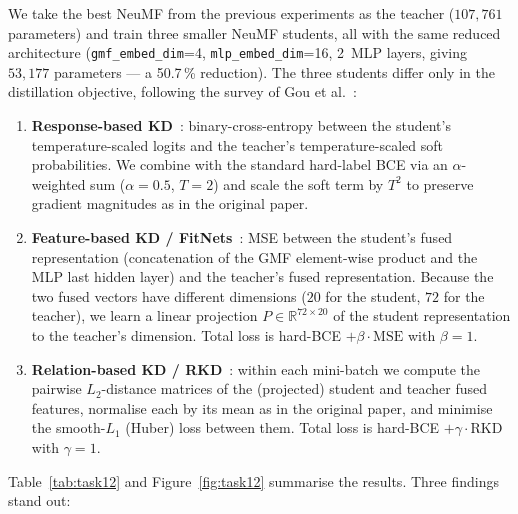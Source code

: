 \documentclass[11pt,a4paper]{article}
\begin{document}
We take the best NeuMF from the previous experiments as the teacher
($107{,}761$ parameters) and train three smaller NeuMF students, all
with the same reduced architecture
(\texttt{gmf\_embed\_dim}=4, \texttt{mlp\_embed\_dim}=16, 2~MLP layers,
giving $53{,}177$ parameters --- a 50.7\,\% reduction). The three
students differ only in the distillation objective, following the
survey of Gou et al.~\cite{gou2021kd}:

\begin{enumerate}
  \item \textbf{Response-based KD}~\cite{hinton2015distilling}:
        binary-cross-entropy between the student's
        temperature-scaled logits and the teacher's
        temperature-scaled soft probabilities. We combine with the
        standard hard-label BCE via an $\alpha$-weighted sum
        ($\alpha = 0.5$, $T = 2$) and scale the soft term by $T^2$
        to preserve gradient magnitudes as in the original paper.
  \item \textbf{Feature-based KD / FitNets}~\cite{romero2014fitnets}:
        MSE between the student's fused representation (concatenation
        of the GMF element-wise product and the MLP last hidden layer)
        and the teacher's fused representation. Because the two fused
        vectors have different dimensions ($20$ for the student,
        $72$ for the teacher), we learn a linear projection
        $P \in \mathbb{R}^{72 \times 20}$ of the student representation
        to the teacher's dimension. Total loss is
        hard-BCE $+ \beta \cdot \mathrm{MSE}$ with $\beta = 1$.
  \item \textbf{Relation-based KD / RKD}~\cite{park2019rkd}: within each
        mini-batch we compute the pairwise $L_2$-distance matrices of
        the (projected) student and teacher fused features, normalise
        each by its mean as in the original paper, and minimise the
        smooth-$L_1$ (Huber) loss between them. Total loss is
        hard-BCE $+ \gamma \cdot \mathrm{RKD}$ with $\gamma = 1$.
\end{enumerate}

Table~\ref{tab:task12} and Figure~\ref{fig:task12} summarise the results.
Three findings stand out:
\end{document}
